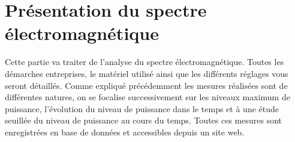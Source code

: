\part{Présentation du spectre électromagnétique}
Cette partie va traiter de l'analyse du spectre électromagnétique.
Toutes les démarches entreprises, le matériel utilisé ainsi que
    les différents réglages vous seront détaillés.
Comme expliqué précédemment les mesures réalisées sont de différentes natures,
    on se focalise successivement sur les niveaux maximum de puissance,
    l’évolution du niveau de puissance dans le temps et à une étude seuillée du niveau de puissance au cours du temps.
Toutes ces mesures sont enregistrées en base de données et accessibles depuis un site web.



